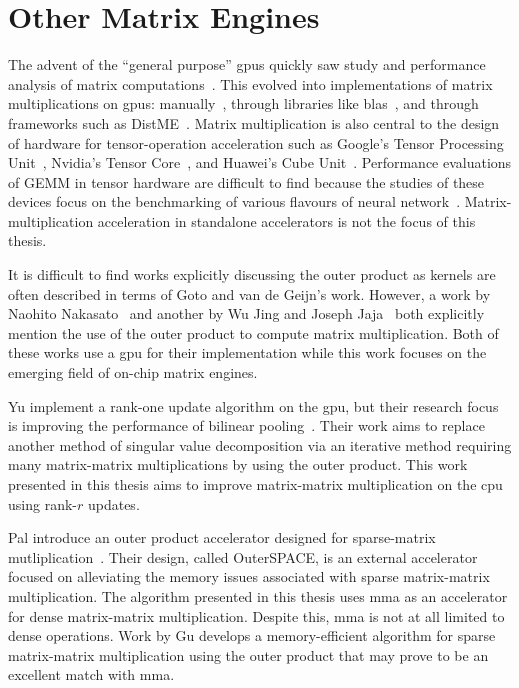 \documentclass[\main/thesis.tex]{subfiles}
\begin{document}
\section{Other Matrix Engines}
The advent of the ``general purpose'' \glspl{gpu} quickly saw study and performance analysis of matrix computations~\autocite{larsen2001fast,fatahalian2004understanding}.
This evolved into implementations of matrix multiplications on \glspl{gpu}: manually~\autocite{li2011strassens}, through libraries like \gls{blas}~\autocite{nath2011accelerating}, and through frameworks such as DistME~\autocite{han2019distme}.
Matrix multiplication is also central to the design of hardware for tensor-operation acceleration such as Google's Tensor Processing Unit~\autocite{jouppi2017datacenter}, Nvidia's Tensor Core~\autocite{markidis2018nvidia}, and Huawei's Cube Unit~\autocite{liao2019davinci}.
Performance evaluations of GEMM in tensor hardware are difficult to find because the studies of these devices focus on the benchmarking of various flavours of neural network~\autocite{jouppi2017datacenter,wang2019benchmarking}.
Matrix-multiplication acceleration in standalone accelerators is not the focus of this thesis.

It is difficult to find works explicitly discussing the outer product as kernels are often described in terms of Goto and van de Geijn's work.
However, a work by Naohito Nakasato~\autocite{nakasato2011fast} and another by Wu Jing and Joseph Jaja~\autocite{wu2016achieving} both explicitly mention the use of the outer product to compute matrix multiplication.
Both of these works use a \gls{gpu} for their implementation while this work focuses on the emerging field of on-chip matrix engines.

Yu \etal implement a rank-one update algorithm on the \gls{gpu}, but their research focus is improving the performance of bilinear pooling~\autocite{yu2020toward}.
Their work aims to replace another method of singular value decomposition via an iterative method requiring many matrix-matrix multiplications by using the outer product.
This work presented in this thesis aims to improve matrix-matrix multiplication on the \gls{cpu} using rank-$r$ updates.

Pal \etal introduce an outer product accelerator designed for sparse-matrix mutliplication~\autocite{pal2018outerspace}.
Their design, called OuterSPACE, is an external accelerator focused on alleviating the memory issues associated with sparse matrix-matrix multiplication.
The algorithm presented in this thesis uses \gls{mma} as an accelerator for dense matrix-matrix multiplication.
Despite this, \gls{mma} is not at all limited to dense operations.
Work by Gu \etal develops a memory-efficient algorithm for sparse matrix-matrix multiplication using the outer product that may prove to be an excellent match with \gls{mma}.
\end{document}
